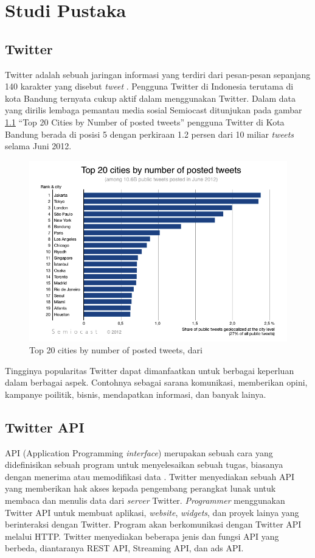 \chapter{Studi Pustaka}
\section{Twitter}
Twitter adalah sebuah jaringan informasi yang terdiri dari pesan-pesan sepanjang 140 karakter yang disebut \textit{tweet} \cite{TwitterDef:2015}. Pengguna Twitter di Indonesia terutama di kota Bandung ternyata cukup aktif dalam menggunakan Twitter. Dalam data yang dirilis lembaga pemantau media sosial Semiocast ditunjukan pada gambar \ref{fig:num_post_tweet} ``Top 20 Cities by Number of posted tweets'' pengguna Twitter di Kota Bandung berada di posisi 5 dengan perkiraan 1.2 persen dari 10 miliar \textit{tweets} selama Juni 2012.
\begin{figure}
\centering
\includegraphics[width=\linewidth]{Gambar/mine/twittercity}
\caption[Top 20 cities by number of posted tweets, dari \cite{Semiocast20Cities:2012}]{Top 20 cities by number of posted tweets, dari \cite{Semiocast20Cities:2012}} 
\label{fig:num_post_tweet}
\end{figure}
Tingginya popularitas Twitter dapat dimanfaatkan untuk berbagai keperluan dalam berbagai aspek. Contohnya sebagai sarana komunikasi, memberikan opini, kampanye poilitik, bisnis, mendapatkan informasi, dan banyak lainya.
\section{Twitter API}
API (Application Programming \textit{interface}) merupakan sebuah cara yang didefinisikan sebuah program untuk menyelesaikan sebuah tugas, biasanya dengan menerima atau memodifikasi data \cite{TwitterApi:2015}. Twitter menyediakan sebuah API yang memberikan hak akses kepada pengembang perangkat lunak untuk membaca dan menulis data dari \textit{server}  Twitter. \textit{Programmer} menggunakan Twitter API untuk membuat aplikasi, \textit{website}, \textit{widgets}, dan proyek lainya yang berinteraksi dengan Twitter. Program akan berkomunikasi dengan Twitter API melalui HTTP. Twitter menyediakan beberapa jenis dan fungsi API yang berbeda, diantaranya REST API, Streaming API, dan ads API.
